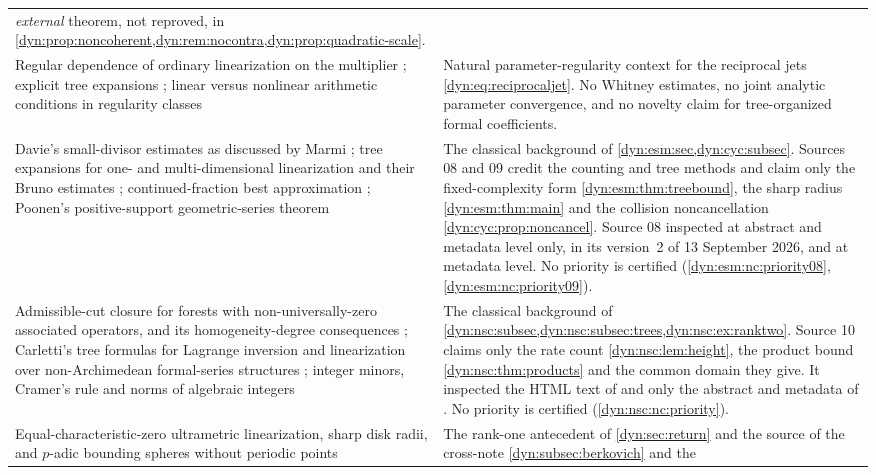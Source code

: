 \documentclass[11pt,letterpaper]{article}
\theoremstyle{definition}
\theoremstyle{remark}
\numberwithin{equation}{section}
\begin{document}
\begin{longtable}{@{}P{0.30\textwidth}P{0.62\textwidth}@{}}
\emph{external} theorem, not reproved, in
\cref{dyn:prop:noncoherent,dyn:rem:nocontra,dyn:prop:quadratic-scale}.\\[3pt]
Regular dependence of ordinary linearization on the multiplier
\cite{CarminatiMarmi}; explicit tree expansions
\cite{FauvetMenousSauzin}; linear versus nonlinear arithmetic conditions in
regularity classes \cite{Bounemoura}
& Natural parameter-regularity context for the reciprocal jets
\eqref{dyn:eq:reciprocaljet}. No Whitney estimates, no joint analytic
parameter convergence, and no novelty claim for tree-organized formal
coefficients.\\[3pt]
Davie's small-divisor estimates as discussed by Marmi \cite{Marmi}; tree
expansions for one- and multi-dimensional linearization and their Bruno
estimates \cite{FauvetMenousSauzin,FMS26}; continued-fraction best
approximation \cite{Marmi,CarminatiMarmi}; Poonen's positive-support
geometric-series theorem \cite[Thm.~4.1]{Poonen}
& The classical background of \cref{dyn:esm:sec,dyn:cyc:subsec}. Sources
08 and 09 credit the counting and tree methods and claim only the
fixed-complexity form \cref{dyn:esm:thm:treebound}, the sharp radius
\cref{dyn:esm:thm:main} and the collision noncancellation
\cref{dyn:cyc:prop:noncancel}. Source 08 inspected
\cite{FauvetMenousSauzin} at abstract and metadata level only, \cite{FMS26}
in its version~2 of 13 September 2026, and \cite{Yoccoz} at metadata level.
No priority is certified (\ref{dyn:esm:nc:priority08},
\ref{dyn:esm:nc:priority09}).\\[3pt]
Admissible-cut closure for forests with non-universally-zero associated
operators, and its homogeneity-degree consequences
\cite[Thm.~E and Prop.~5.6]{FMS26};
Carletti's tree formulas for Lagrange inversion and linearization over
non-Archimedean formal-series structures \cite{CarlettiLagrange};
integer minors, Cramer's rule and norms of algebraic integers
& The classical background of \cref{dyn:nsc:subsec,dyn:nsc:subsec:trees,dyn:nsc:ex:ranktwo}.
Source 10 claims only the rate count \cref{dyn:nsc:lem:height}, the product
bound \cref{dyn:nsc:thm:products} and the common domain they give. It
inspected the HTML text of \cite{FMS26} and only the abstract and metadata of
\cite{CarlettiLagrange}. No priority is certified
(\ref{dyn:nsc:nc:priority}).\\[3pt]
Equal-characteristic-zero ultrametric linearization, sharp disk radii, and
$p$-adic bounding spheres without periodic points
\cite{Lindahl,LindahlPadic}
& The rank-one antecedent of \cref{dyn:sec:return} and the
source of the cross-note \cref{dyn:subsec:berkovich} and the

\end{longtable}
\end{document}
